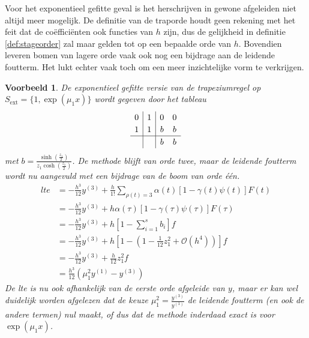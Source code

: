 \documentclass[12pt]{article}
\newtheorem{vbn}[defn]{Voorbeeld}
\begin{document}
Voor het exponentieel gefitte geval is het herschrijven in gewone afgeleiden niet altijd meer mogelijk. De definitie van de traporde houdt geen rekening met het feit dat de coëfficiënten ook functies van \(h\) zijn, dus de gelijkheid in definitie \ref{def:stageorder} zal maar gelden tot op een bepaalde orde van \(h\). Bovendien leveren bomen van lagere orde vaak ook nog een bijdrage aan de leidende foutterm. Het lukt echter vaak toch om een meer inzichtelijke vorm te verkrijgen.
\begin{vbn}
    De exponentieel gefitte versie van de trapeziumregel op \(S_{\textrm{ext}}=\{1,\exp(\mu_1x)\}\) wordt gegeven door het tableau
    \[
    \renewcommand\arraystretch{1.2}
    \begin{array}
    {c|c|cc}
    0 & 1 & 0 & 0 \\
    1 & 1 & b & b \\
    \hline
    && b & b
    \end{array}
    \]
    met \(b=\frac{\sinh\left(\frac{z_1}{2}\right)}{z_1\cosh\left(\frac{z_1}{2}\right)}\). De methode blijft van orde twee, maar de leidende foutterm wordt nu aangevuld met een bijdrage van de boom van orde één.
    \begin{align*}
        lte&=-\frac{h^3}{12}y^{(3)}+\frac{h}{1!}\sum_{\rho(t)=3}\alpha(t)[1-\gamma(t)\psi(t)]F(t) \\
        &=-\frac{h^3}{12}y^{(3)}+h\alpha(\tau)[1-\gamma(\tau)\psi(\tau)]F(\tau) \\
        &=-\frac{h^3}{12}y^{(3)}+h[1-\sum^s_{i=1}b_i]f \\
        &=-\frac{h^3}{12}y^{(3)}+h[1-(1-\frac{1}{12}z_1^2+\mathcal{O}(h^4))]f \\
        &=-\frac{h^3}{12}y^{(3)}+\frac{h}{12}z_1^2f \\
        &=\frac{h^3}{12}(\mu_1^2y^{(1)}-y^{(3)})
    \end{align*}
    De lte is nu ook afhankelijk van de eerste orde afgeleide van \(y\), maar er kan wel duidelijk worden afgelezen dat de keuze \(\mu_1^2=\frac{y^{(3)}}{y^{(1)}}\) de leidende foutterm (en ook de andere termen) nul maakt, of dus dat de methode inderdaad exact is voor \(\exp(\mu_1x)\).
\end{vbn}
\end{document}

